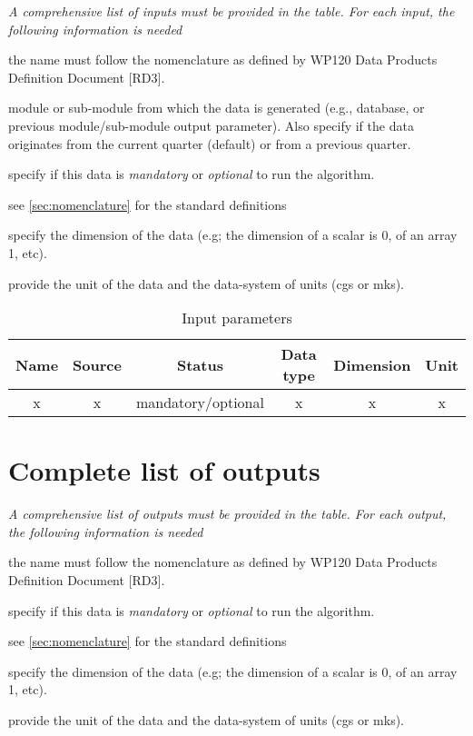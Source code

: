 \documentclass[a4paper, oneside, 11pt, article, english]{memoir}
\begin{document}
{
  \itshape
  A comprehensive list of inputs must be provided in the table. For each input,
  the following information is needed

  \begin{description}
    \firmlist
  \item[Name] the name must follow the nomenclature as defined by WP120 Data
    Products Definition Document [RD3].
  \item[Source] module or sub-module from which the data is generated (e.g.,
    database, or previous module/sub-module output parameter). Also specify if the
    data originates from the current quarter (default) or from a previous quarter.
  \item[Status] specify if this data is \emph{mandatory} or \emph{optional} to run the algorithm.
  \item[Data type] see \cref{sec:nomenclature} for the standard definitions
  \item[Dimension] specify the dimension of the data (e.g; the dimension of a scalar is 0, of an array 1, etc).
  \item[Unit] provide the unit of the data and the data-system of units (cgs or mks).
  \end{description}
}

\begin{table}[htbp]
  \centering
  \caption{Input parameters}
  \label{tab:input}
  \begin{tabular}{cccccc}
    \toprule
    Name & Source & Status & Data type & Dimension & Unit \\
    \midrule
    x & x & mandatory/optional & x & x & x \\
    \bottomrule
  \end{tabular}
\end{table}


\section{Complete list of outputs}
\label{sec:output}

{
  \itshape
  A comprehensive list of outputs must be provided in the table. For each output,
  the following information is needed

  \begin{description}
    \firmlist
  \item[Name] the name must follow the nomenclature as defined by WP120 Data
    Products Definition Document [RD3].
  \item[Status] specify if this data is \emph{mandatory} or \emph{optional} to run the algorithm.
  \item[Data type] see \cref{sec:nomenclature} for the standard definitions
  \item[Dimension] specify the dimension of the data (e.g; the dimension of a scalar is 0, of an array 1, etc).
  \item[Unit] provide the unit of the data and the data-system of units (cgs or mks).
  \end{description}
}
\end{document}
